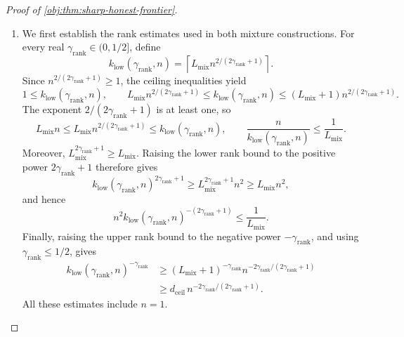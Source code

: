 \begin{proof}[Proof of \cref{obj:thm:sharp-honest-frontier}]
\begin{enumerate}
\item We first establish the rank estimates used in both mixture constructions.
For every real \(\gamma_{\mathrm{rank}}\in(0,1/2]\), define
\[
k_{\mathrm{low}}(\gamma_{\mathrm{rank}},n)
=
\left\lceil
L_{\mathrm{mix}}n^{2/(2\gamma_{\mathrm{rank}}+1)}
\right\rceil.
\]
Since \(n^{2/(2\gamma_{\mathrm{rank}}+1)}\ge1\), the ceiling inequalities yield
\[
1\le k_{\mathrm{low}}(\gamma_{\mathrm{rank}},n),\qquad
L_{\mathrm{mix}}n^{2/(2\gamma_{\mathrm{rank}}+1)}
\le k_{\mathrm{low}}(\gamma_{\mathrm{rank}},n)
\le
(L_{\mathrm{mix}}+1)n^{2/(2\gamma_{\mathrm{rank}}+1)}.
\]
The exponent \(2/(2\gamma_{\mathrm{rank}}+1)\) is at least one, so
\[
L_{\mathrm{mix}}n
\le
L_{\mathrm{mix}}n^{2/(2\gamma_{\mathrm{rank}}+1)}
\le k_{\mathrm{low}}(\gamma_{\mathrm{rank}},n),
\qquad
\frac{n}{k_{\mathrm{low}}(\gamma_{\mathrm{rank}},n)}
\le\frac1{L_{\mathrm{mix}}}.
\]
Moreover, \(L_{\mathrm{mix}}^{2\gamma_{\mathrm{rank}}+1}\ge L_{\mathrm{mix}}\).
Raising the lower rank bound to the positive power \(2\gamma_{\mathrm{rank}}+1\) therefore gives
\[
k_{\mathrm{low}}(\gamma_{\mathrm{rank}},n)^{2\gamma_{\mathrm{rank}}+1}
\ge
L_{\mathrm{mix}}^{2\gamma_{\mathrm{rank}}+1}n^2
\ge L_{\mathrm{mix}}n^2,
\]
and hence
\[
n^2k_{\mathrm{low}}(\gamma_{\mathrm{rank}},n)^{-(2\gamma_{\mathrm{rank}}+1)}
\le\frac1{L_{\mathrm{mix}}}.
\]
Finally, raising the upper rank bound to the negative power
\(-\gamma_{\mathrm{rank}}\), and using
\(\gamma_{\mathrm{rank}}\le1/2\), gives
\[
\begin{aligned}
k_{\mathrm{low}}(\gamma_{\mathrm{rank}},n)^{-\gamma_{\mathrm{rank}}}
&\ge
(L_{\mathrm{mix}}+1)^{-\gamma_{\mathrm{rank}}}
n^{-2\gamma_{\mathrm{rank}}/(2\gamma_{\mathrm{rank}}+1)}\\
&\ge
d_{\mathrm{ceil}}\,
n^{-2\gamma_{\mathrm{rank}}/(2\gamma_{\mathrm{rank}}+1)}.
\end{aligned}
\]
All these estimates include \(n=1\).


\end{enumerate}
\end{proof}
